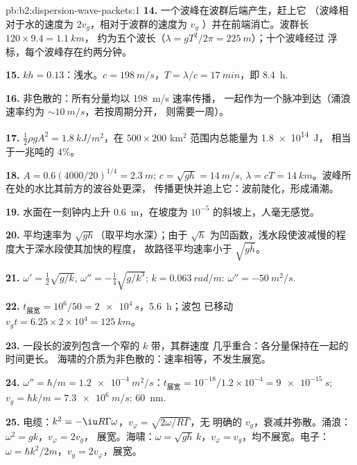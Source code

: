 \begin{solution}{pb:b2:dispersion-wave-packets:1}
\textbf{14.} 一个波峰在波群后端产生，赶上它
（波峰相对于水的速度为 $2v_g$，相对于波群的速度为 $v_g$
）并在前端消亡。波群长 $120 \times 9.4 = \qty{1.1}{km}$，
约为五个波长（$\lambda = gT^2/2\pi = \qty{225}{m}$）；十个波峰经过
浮标，每个波峰存在约两分钟。

\textbf{15.} $kh = 0.13$：浅水。$c = \qty{198}{m/s}$，$T = \lambda/c = \qty{17}{min}$，即
\qty{8.4}{h}.

\textbf{16.} 非色散的：所有分量均以 \qty{198}{m/s} 速率传播，
一起作为一个脉冲到达（涌浪速率约为 $\sim\qty{10}{m/s}$，若按周期分开，
则需要一周）。

\textbf{17.} $\tfrac12\rho gA^2 = \qty{1.8}{kJ/m^2}$，在 $500 \times 200$ km$^2$ 范围内总能量为 \qty{1.8e14}{J}，
相当于一兆吨的 $4\%$。

\textbf{18.} $A = 0.6(4000/20)^{1/4} = \qty{2.3}{m}$; $c = \sqrt{gh} = \qty{14}{m/s}$, $\lambda =
cT = \qty{14}{km}$。波峰所在处的水比其前方的波谷处更深，
传播更快并追上它：波前陡化，形成涌潮。

\textbf{19.} 水面在一刻钟内上升 \qty{0.6}{m}，在坡度为
$10^{-5}$ 的斜坡上，人毫无感觉。

\textbf{20.} 平均速率为 $\sqrt{gh}$（取平均水深）；由于
$\sqrt h$ 为凹函数，浅水段使波减慢的程度大于深水段使其加快的程度，
故路径平均速率小于 $\sqrt{g\bar h}$。

\textbf{21.} $\omega' = \tfrac12\sqrt{g/k}$, $\omega'' = -\tfrac14\sqrt{g/k^3}$; $k = \qty{0.063}{rad/m}$:
$\omega'' = \qty{-50}{m^2/s}$.

\textbf{22.} $t_{\text{展宽}} = 10^6/50 = \qty{2e4}{s}$，\qty{5.6}{h}；波包
已移动 $v_gt = 6.25 \times 2 \times 10^4 = \qty{125}{km}$。

\textbf{23.} 一段长的波列包含一个窄的 $k$ 带，其群速度
几乎重合：各分量保持在一起的时间更长。
海啸的介质为非色散的：速率相等，不发生展宽。

\textbf{24.} $\omega'' = \hbar/m = \qty{1.2e-4}{m^2/s}$：$t_{\text{展宽}} = 10^{-18}/1.2 \times
10^{-4} = \qty{9e-15}{s}$; $v_g = \hbar k/m = \qty{7.3e6}{m/s}$: \qty{60}{nm}.

\textbf{25.} 电缆：$k^2 = -\iu R\Gamma\omega$，$v_\varphi = \sqrt{2\omega/R\Gamma}$，无
明确的 $v_g$，衰减并弥散。涌浪：$\omega^2 = gk$，$v_\varphi = 2v_g$，
展宽。海啸：$\omega = \sqrt{gh}\,k$，$v_\varphi = v_g$，均不展宽。电子：
$\omega = \hbar k^2/2m$，$v_g = 2v_\varphi$，展宽。
\end{solution}
